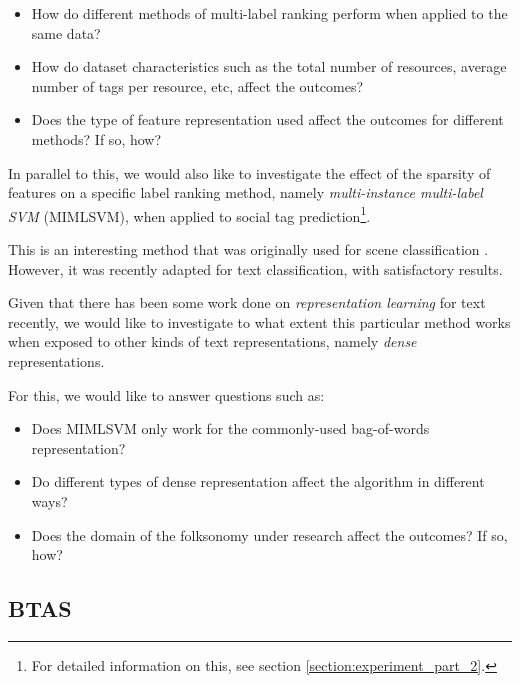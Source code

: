 \begin{itemize}
    \item How do different methods of multi-label ranking perform when applied to the same data?
    
    \item How do dataset characteristics such as the total number of resources, average number of tags per resource, etc, affect the outcomes?
    
    \item Does the type of feature representation used affect the outcomes for different methods? If so, how?

\end{itemize}

In parallel to this, we would also like to investigate the effect of the sparsity of features on a specific label ranking method, namely \textit{multi-instance multi-label SVM} (MIMLSVM), when applied to social tag prediction\footnote{For detailed  information on this, see section \ref{section:experiment_part_2}.}. 

This is an interesting method that was originally used for scene classification \citep{zhang_zhou_2007}. However, it was recently \citep{shen_etal_2009} adapted for text classification, with satisfactory results.

Given that there has been some work done on \textit{representation learning} for text \citep{bengio_etal_2003,efficientestimation,le_mikolov_2014} recently, we would like to investigate to what extent this particular method works when exposed to other kinds of text representations, namely \textit{dense} representations.

For this, we would like to answer questions such as:

\begin{itemize}
    \item Does MIMLSVM only work for the commonly-used bag-of-words representation?
    
    \item Do different types of dense representation affect the algorithm in different ways?
    
    \item Does the domain of the folksonomy under research affect the outcomes? If so, how?

\end{itemize}

\subsection{BTAS}

